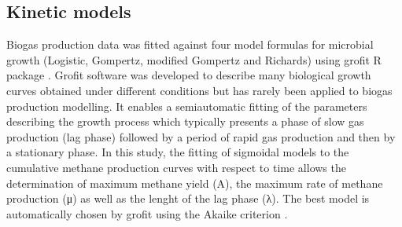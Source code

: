 \subsection{Kinetic models}
Biogas production data was fitted against four model formulas for microbial growth (Logistic, Gompertz, modified Gompertz and Richards) using grofit R package \cite{Kahm_2010}. Grofit software was developed to describe many biological growth curves obtained under different conditions but has rarely been applied to biogas production modelling. It enables a semiautomatic fitting of the parameters describing the growth process which typically presents a phase of slow gas production (lag phase) followed by a period of rapid gas production and then by a stationary phase. In this study, the fitting of sigmoidal models to the cumulative methane production curves  with respect to time allows the determination of maximum methane yield (A), the maximum rate of methane production (μ) as well as the lenght of the lag phase (λ). The best model is automatically chosen by grofit using the Akaike criterion \cite{Hasenbrink_2006}.